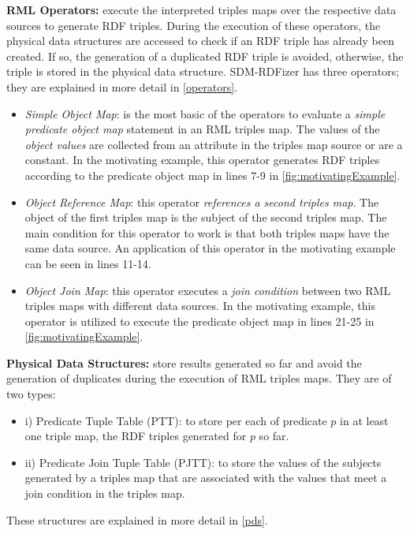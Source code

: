 \noindent\textbf{RML Operators:} execute the interpreted triples maps over the respective data sources to generate RDF triples. 
During the execution of these operators, the physical data structures are accessed to check if an RDF triple has already been created.
If so, the generation of a duplicated RDF triple is avoided, otherwise, the triple is stored in the physical data structure.
SDM-RDFizer has three operators; they are explained in more detail in \autoref{operators}.
    \begin{itemize}
        \item \textit{Simple Object Map}: is the most basic of the operators to evaluate a \textit{simple predicate object map} statement in an RML triples map. The values of the \textit{object values} are collected from an attribute in the triples map source or are a constant. In the motivating example, this operator generates RDF triples according to the predicate object map in lines 7-9 in \autoref{fig:motivatingExample}.  
        \item \textit{Object Reference Map}: this operator \textit{references a second triples map}. The object of the first triples map is the subject of the second triples map. The main condition for this operator to work is that both triples maps have the same data source. An application of this operator in the motivating example can be seen in lines 11-14. 
        \item \textit{Object Join Map}: this operator executes a \textit{join condition} between two RML triples maps with different data sources. In the motivating example, this operator is utilized to execute the predicate object map in lines 21-25 in \autoref{fig:motivatingExample}.
    \end{itemize}
    
\noindent\textbf{Physical Data Structures:} store results generated so far and avoid the generation of duplicates during the execution of RML triples maps. They are of two types: 
\begin{itemize}
\item i) Predicate Tuple Table (PTT): to store per each of predicate $p$ in at least one triple map, the RDF triples generated for $p$ so far. 
\item ii) Predicate Join Tuple Table (PJTT): to store the values of the subjects generated by a triples map that are associated with the values that meet a join condition in the triples map.  
\end{itemize}
These structures are explained in more detail in \autoref{pds}.

